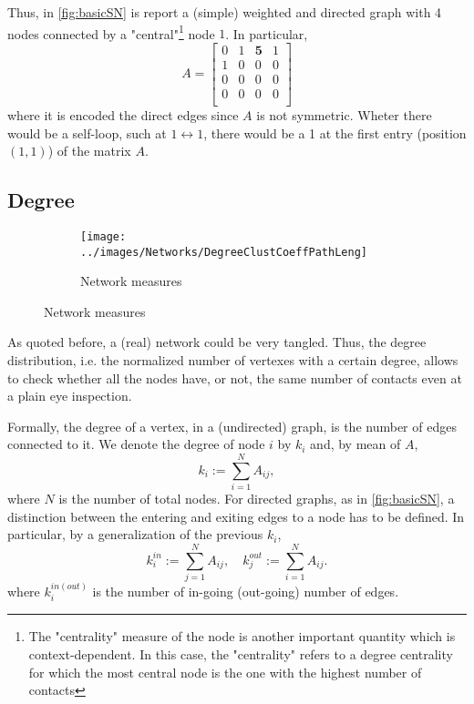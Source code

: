 \documentclass[a4paper,10pt,twoside]{book} %
\theoremstyle{definition}
\begin{document}
Thus, in \autoref{fig:basicSN} is report a (simple) weighted and directed graph with 4 nodes connected by a "central"\footnote{The "centrality" measure of the node is another important quantity which is context-dependent. In this case, the "centrality" refers to a degree centrality for which the most central node is the one with the highest number of contacts} node $1$.
In particular,
\[
A = 
\begin{bmatrix}
0 & 1 & \textbf{5} & 1 \\
1 & 0 & 0 & 0 \\
0 & 0 & 0 & 0 \\
0 & 0 & 0 & 0 \\ 
\end{bmatrix}
\]
where it is encoded the direct edges since $A$ is not symmetric. Wheter there would be a self-loop, such at $ 1 \longleftrightarrow 1 $, there would be a 1 at the first entry (position $(1,1)$) of the matrix $A$.

\subsection{Degree}

\begin{figure}[ht]
    \begin{subfigure}{\textwidth}
        \texttt{[image: ../images/Networks/DegreeClustCoeffPathLeng]}
        \centering
        \caption{Network measures \cite{Olaf:2011_NonRandomBrain}}
        \label{fig:degree_clustcoefficient_pathlength}
    \end{subfigure}
\end{figure}
As quoted before, a (real) network could be very tangled. Thus, the degree distribution, i.e. the normalized number of vertexes with a certain degree, allows to check whether all the nodes have, or not, the same number of contacts even at a plain eye inspection. 

Formally, the degree of a vertex, in a (undirected) graph, is the number of edges connected to it. We denote the degree of node $i$ by $k_i$ and, by mean of $A$, $$k_i := \sum_{i=1}^{N} A_{ij},$$ where $N$ is the number of total nodes.
For directed graphs, as in \autoref{fig:basicSN}, a distinction between the entering and exiting edges to a node has to be defined. In particular, by a generalization of the previous $k_i$, 
\begin{equation}
	k_i^{in} := \sum_{j=1}^N A_{ij}, \quad k_j^{out} := \sum_{i=1}^N A_{ij}.
	\label{eq:kin_kout}	
\end{equation}
where $k_i^{in(out)}$ is the number of in-going (out-going) number of edges. 
\end{document}
